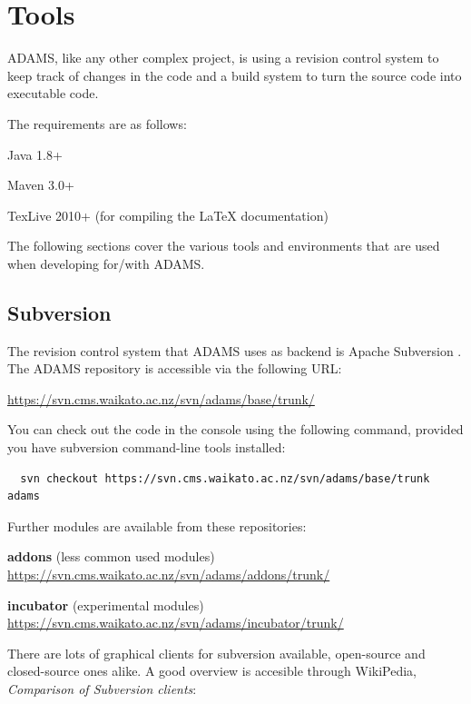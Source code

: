
\chapter{Tools}
ADAMS, like any other complex project, is using a revision control system to
keep track of changes in the code and a build system to turn the source code
into executable code.

The requirements are as follows:
\begin{tight_itemize}
  \item Java 1.8+
  \item Maven 3.0+
  \item TexLive 2010+ (for compiling the LaTeX documentation)
\end{tight_itemize}

The following sections cover the various tools and environments that are
used when developing for/with ADAMS.

\section{Subversion}
The revision control system that ADAMS uses as backend is Apache Subversion
\cite{subversion}. The ADAMS repository is accessible via the
following URL:

\url{https://svn.cms.waikato.ac.nz/svn/adams/base/trunk/}{}

\noindent You can check out the code in the console using the following
command, provided you have subversion command-line tools installed:
\begin{verbatim}
  svn checkout https://svn.cms.waikato.ac.nz/svn/adams/base/trunk adams
\end{verbatim}

Further modules are available from these repositories:
\begin{tight_itemize}
	\item \textbf{addons} (less common used modules) \\
	\url{https://svn.cms.waikato.ac.nz/svn/adams/addons/trunk/}{}
	\item \textbf{incubator} (experimental modules) \\
	\url{https://svn.cms.waikato.ac.nz/svn/adams/incubator/trunk/}{}
\end{tight_itemize}

\noindent There are lots of graphical clients for subversion available,
open-source and closed-source ones alike. A good overview is accesible through
WikiPedia, \textit{Comparison of Subversion clients}:

